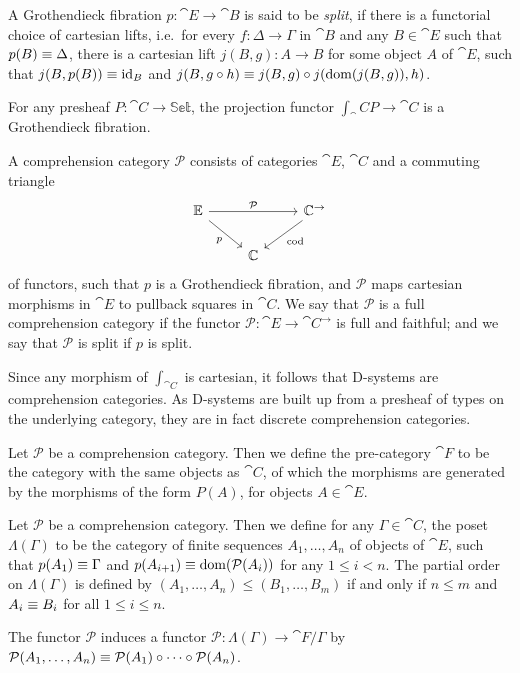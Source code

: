 \begin{defn}
A Grothendieck fibration $p:\cat{E}\to\cat{B}$ is said to be \emph{split}, if
there is a functorial choice of cartesian lifts, i.e.~for every $f:\Delta\to \Gamma$ in 
$\cat{B}$ and any $B\in \cat{E}$ such that $p(B)\equiv \Delta$,
there is a cartesian lift $j(B,g):A \to B$ for some object $A$ of $\cat{E}$, such that 
$j(B,p(B))\equiv{\mathrm{id}_{B}}$ and $j(B, g\circ h)\equiv j(B,g)\circ j(\mathrm{dom}(j(B,g)),h)$.
\end{defn}

\begin{eg}
For any presheaf $P:\cat{C}\to\mathbb{Set}$, the projection functor
$\int_\cat{C} P\to\cat{C}$ is a Grothendieck fibration.
\end{eg}

\begin{defn}
A comprehension category $\mathcal{P}$ consists of categories $\cat{E}$, $\cat{C}$ and a
commuting triangle
\begin{equation*}
\begin{tikzcd}
\cat{E} \arrow[rr,"\mathcal{P}"] \arrow[dr,swap,"p"] & & \cat{C}^{\to} \arrow[dl,"\mathrm{cod}"] \\
& \cat{C}
\end{tikzcd}
\end{equation*}
of functors, such that $p$ is a Grothendieck fibration, and $\mathcal{P}$ maps
cartesian morphisms in $\cat{E}$ to pullback squares in $\cat{C}$. We say that
$\mathcal{P}$ is a full comprehension category if the functor $\mathcal{P}:
\cat{E}\to\cat{C}^{\to}$ is full and faithful; and we say that
$\mathcal{P}$ is split if $p$ is split.
\end{defn}

\begin{eg}
Since any morphism of $\int_{\cat{C}}$ is cartesian, it follows that D-systems
are comprehension categories. As D-systems are built up from a presheaf of types
on the underlying category, they are in fact discrete comprehension categories.
\end{eg}

\begin{defn}
Let $\mathcal{P}$ be a comprehension category. Then we define the pre-category
$\cat{F}$ to be the category with the same objects as $\cat{C}$, of which the
morphisms are generated by the morphisms of the form $P(A)$, for objects
$A\in\cat{E}$. 
\end{defn}

\begin{defn}
Let $\mathcal{P}$ be a comprehension category. Then we define for any 
$\Gamma\in\cat{C}$, the poset $\Lambda(\Gamma)$ to be the category of finite 
sequences  $A_1,\ldots,A_n$ of objects of $\cat{E}$, such that 
$p(A_1)\equiv\Gamma$ and $p(A_{i+1})\equiv\mathrm{dom}(\mathcal{P}(A_i))$ 
for any $1\leq i < n$. The partial order on 
$\Lambda(\Gamma)$ is defined by $(A_1,\ldots,A_n)\leq (B_1,\ldots,B_m)$ if and 
only if $n\leq m$ and $A_i\equiv B_i$ for all $1\leq i\leq n$.

The functor $\mathcal{P}$ induces a functor $\mathcal{P}:\Lambda(\Gamma)\to
\cat{F}/\Gamma$ by $\mathcal{P}(A_1,\ldots,A_n)\equiv\mathcal{P}(A_1)\circ
\cdots\circ\mathcal{P}(A_n)$.
\end{defn}

